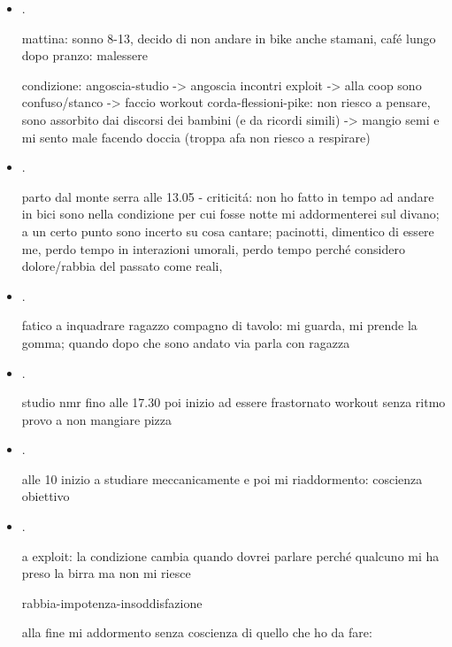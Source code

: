 \begin{itemize}
\item {}.

mattina: sonno 8-13, decido di non andare in bike anche stamani, caf\'e lungo dopo pranzo: malessere

condizione: angoscia-studio -> angoscia incontri exploit -> alla coop sono confuso/stanco -> faccio workout corda-flessioni-pike: non riesco a pensare, sono assorbito dai discorsi dei bambini (e da ricordi simili) -> mangio semi e mi sento male facendo doccia (troppa afa non riesco a respirare)

\item {}.

parto dal monte serra alle 13.05 - criticit\'a:  non ho fatto in tempo ad andare in bici sono nella condizione per cui fosse notte mi addormenterei sul divano;  a un certo punto sono incerto su cosa cantare;  pacinotti, dimentico di essere me, perdo tempo in interazioni umorali, perdo tempo perch\'e considero dolore/rabbia del passato come reali, 

\item {}.

fatico a inquadrare ragazzo compagno di tavolo: mi guarda, mi prende la gomma;  quando dopo che sono andato via parla con ragazza

\item {}.

studio nmr fino alle 17.30 poi inizio ad essere frastornato
workout senza ritmo
provo a non mangiare pizza

\item {}.

alle 10 inizio a studiare meccanicamente e poi mi riaddormento: coscienza obiettivo

\item {}.

a exploit: la condizione cambia quando dovrei parlare perch\'e qualcuno mi ha preso la birra ma non mi riesce

rabbia-impotenza-insoddisfazione 

alla fine mi addormento senza coscienza di quello che ho da fare: 


\end{itemize}
